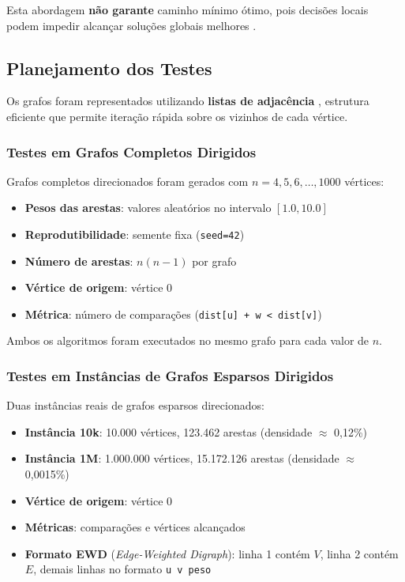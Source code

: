 \documentclass[12pt,a4paper]{article}
\begin{document}
Esta abordagem \textbf{não garante} caminho mínimo ótimo, pois decisões locais podem impedir alcançar soluções globais melhores \cite{cormen2012}.

\subsection{Planejamento dos Testes}

Os grafos foram representados utilizando \textbf{listas de adjacência} \cite{cormen2012, campos2010}, estrutura eficiente que permite iteração rápida sobre os vizinhos de cada vértice.

\subsubsection{Testes em Grafos Completos Dirigidos}

Grafos completos direcionados foram gerados com $n = 4, 5, 6, \ldots, 1000$ vértices:

\begin{itemize}
    \item \textbf{Pesos das arestas}: valores aleatórios no intervalo $[1.0, 10.0]$
    \item \textbf{Reprodutibilidade}: semente fixa (\texttt{seed=42})
    \item \textbf{Número de arestas}: $n(n-1)$ por grafo
    \item \textbf{Vértice de origem}: vértice 0
    \item \textbf{Métrica}: número de comparações (\texttt{dist[u] + w < dist[v]})
\end{itemize}

Ambos os algoritmos foram executados no mesmo grafo para cada valor de $n$.

\subsubsection{Testes em Instâncias de Grafos Esparsos Dirigidos}

Duas instâncias reais de grafos esparsos direcionados:

\begin{itemize}
    \item \textbf{Instância 10k}: 10.000 vértices, 123.462 arestas (densidade $\approx$ 0,12\%)
    \item \textbf{Instância 1M}: 1.000.000 vértices, 15.172.126 arestas (densidade $\approx$ 0,0015\%)
    \item \textbf{Vértice de origem}: vértice 0
    \item \textbf{Métricas}: comparações e vértices alcançados
    \item \textbf{Formato EWD} (\textit{Edge-Weighted Digraph}): linha 1 contém $V$, linha 2 contém $E$, demais linhas no formato \texttt{u v peso}
\end{itemize}
\end{document}
